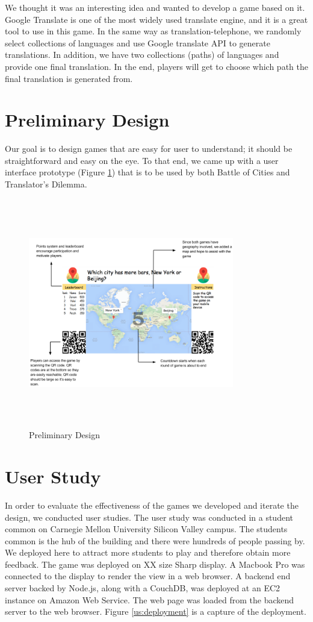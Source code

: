 \documentclass{sig-alternate}
\begin{document}
We thought it was an interesting idea and wanted to develop a game based on it. Google Translate is one of the most widely used translate engine, and it is a great tool to use in this game. In the same way as translation-telephone, we randomly select collections of languages and use Google translate API to generate translations. In addition, we have two collections (paths) of languages and provide one final translation. In the end, players will get to choose which path the final translation is generated from.

\section{Preliminary Design}
Our goal is to design games that are easy for user to understand; it should be straightforward and easy on the eye. To that end, we came up with a user interface prototype (Figure \ref{fig:pre_design}) that is to be used by both Battle of Cities and Translator's Dilemma. 

\begin{figure}
	\centering
	\includegraphics[width=0.8\textwidth,height=10cm]{preliminary_design.png}
	\caption{Preliminary Design}
	\label{fig:pre_design}
\end{figure}

\section{User Study}
In order to evaluate the effectiveness of the games we developed and iterate the design, we conducted user studies. The user study was conducted in a student common on Carnegie Mellon University Silicon Valley campus. The students common is the hub of the building and there were hundreds of people passing by. We deployed here to attract more students to play and therefore obtain more feedback. The game was deployed on XX size Sharp display. A Macbook Pro was connected to the display to render the view in a web browser. A backend end server backed by Node.js, along with a CouchDB, was deployed at an EC2 instance on Amazon Web Service. The web page was loaded from the backend server to the web browser. Figure \ref{us:deployment} is a capture of the deployment. 
\end{document}
